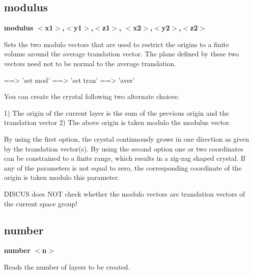 \subsection*{modulus}
{\bf modulus $ <$x1$> $,$ <$y1$> $,$ <$z1$> $, $ <$x2$> $,$ <$y2$> $,$ <$z2$> $ \par }
\par
\vspace{3pt}
Sets the two modulo vectors that are used to restrict the origins to 
a finite volume around the average translation vector. The plane 
defined by these two vectors need not to be normal to the average 
translation. 
\par
\begin{MacVerbatim}
==> 'set mod'
==> 'set tran'
==> 'aver'
\end{MacVerbatim}
You can create the crystal following two alternate choices: 
\par
\begin{MacVerbatim}
  1) The origin of the current layer is the sum of the previous origin
     and the translation vector
  2) The above origin is taken modulo the modulus vector.
\end{MacVerbatim}
By using the first option, the crystal continuously grows in one 
direction as given by the translation vector(s). By using the second 
option one or two coordinates can be constrained to a finite range, which 
results in a zig-zag shaped crystal. If any of the parameters is not 
equal to zero, the corresponding coordinate of the origin is taken modulo 
this parameter. 
\par
DISCUS does NOT check whether the modulo vectors are translation vectors 
of the current space group! 
\subsection*{number}
{\bf number $ <$n$> $ \par }
\par
\vspace{3pt}
Reads the number of layers to be created. 
